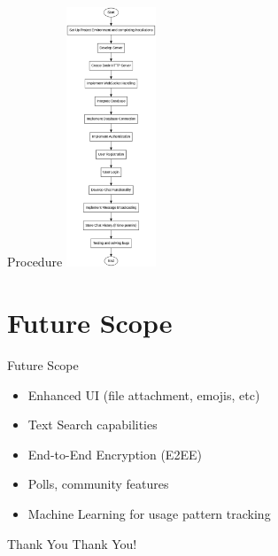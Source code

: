 \documentclass{beamer}
\begin{document}
\begin{frame}{Procedure}
    \centering
    \includegraphics[width=0.2\textwidth]{Graphviz files/Images/implementation.png}
\end{frame}

\section{Future Scope}
\begin{frame}{Future Scope}
    \begin{itemize}
        \item Enhanced UI (file attachment, emojis, etc)
        \item Text Search capabilities
        \item End-to-End Encryption (E2EE)
        \item Polls, community features
        \item Machine Learning for usage pattern tracking
    \end{itemize}
\end{frame}


\begin{frame}{Thank You}
    \centering
    \Huge Thank You!
\end{frame}
\end{document}

